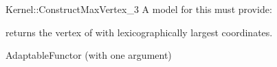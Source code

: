 \begin{ccRefFunctionObjectConcept}{Kernel::ConstructMaxVertex_3}
A model for this must provide:




 {returns the vertex of
   with lexicographically largest coordinates.}


\ccRefines
AdaptableFunctor (with one argument)

\ccSeeAlso
{}

\end{ccRefFunctionObjectConcept}

